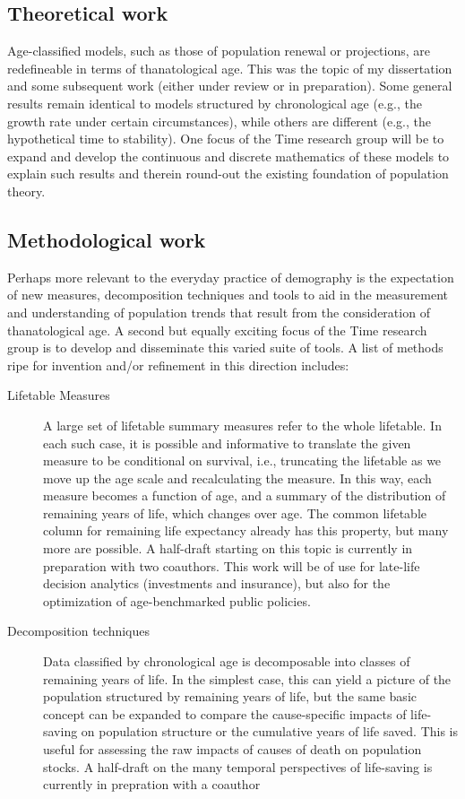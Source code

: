 \documentclass[a4paper,12pt]{article}
\begin{document}
\subsection*{Theoretical work}
Age-classified models, such as those of population renewal or projections, are
redefineable in terms of thanatological age. This was the topic of my
dissertation and some subsequent work (either under review or in preparation).
Some general results remain identical to models structured by chronological age (e.g., the growth rate under certain
circumstances), while others are different (e.g., the hypothetical time to stability). One focus of the Time research group will be to expand and develop the continuous and discrete mathematics of
these models to explain such results and therein round-out the existing
foundation of population theory.
 
\subsection*{Methodological work}
Perhaps more relevant to the everyday practice of demography is the expectation
of new measures, decomposition techniques and tools to aid in the measurement
and understanding of population trends that result from the consideration of
thanatological age. A second but equally exciting focus of the Time research
group is to develop and disseminate this varied suite of tools. A list of
methods ripe for invention and/or refinement in this direction includes:

\begin{description}
\item[Lifetable Measures]{A large set of lifetable summary measures refer to
the whole lifetable. In each such case, it is possible and
informative to translate the given measure to be conditional on survival, i.e.,
truncating the lifetable as we move up the age scale and recalculating the
measure. In this way, each measure becomes a function of age, and a summary of
the distribution of remaining years of life, which changes over age. The common
lifetable column for remaining life expectancy already has this property, but many more are possible. A half-draft
starting on this topic is currently in preparation with two coauthors.
This work will be of use for late-life decision analytics (investments and insurance), but also for the optimization of age-benchmarked public policies.}
\item[Decomposition techniques]{Data classified by chronological age is
decomposable into classes of remaining years of life. In the simplest case,
this can yield a picture of the population structured by remaining years of life, but
the same basic concept can be expanded to compare the cause-specific impacts of
life-saving on population structure or the cumulative
years of life saved. This is useful for assessing the raw impacts of causes of
death on population stocks. A half-draft on the many temporal perspectives of life-saving is currently in prepration with a coauthor}
\end{description}
\end{document}
